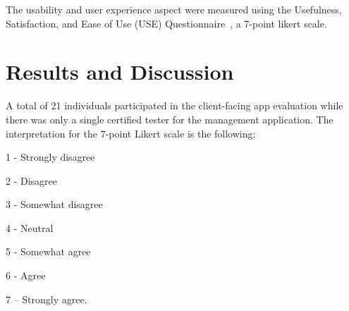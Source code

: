 \documentclass[journal]{./IEEE/IEEEtran}
\begin{document}
The usability and user experience aspect were measured using the Usefulness, Satisfaction, and Ease of Use (USE) Questionnaire~\cite{Lund01}, a 7-point likert scale. 



\section{Results and Discussion}
A total of 21 individuals participated in the client-facing app evaluation while there was only a single certified tester for the management application. The interpretation for the 7-point Likert scale is the following:

\begin{description}
    \item 1 - Strongly disagree
    \item 2 - Disagree
    \item 3 - Somewhat disagree
    \item 4 - Neutral
    \item 5 - Somewhat agree
    \item 6 - Agree
    \item 7 -- Strongly agree.
\end{description}
\end{document}
